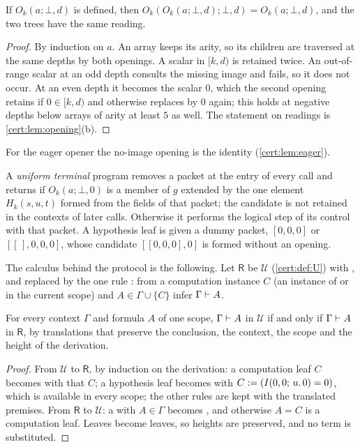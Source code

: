 \begin{lemma}\label{cert:lem:retraction}
If $O_k(a;\bot,d)$ is defined, then $O_k(O_k(a;\bot,d);\bot,d)=O_k(a;\bot,d)$,
and the two trees have the same reading.
\end{lemma}
\begin{proof}
By induction on $a$. An array keeps its arity, so its children are traversed
at the same depths by both openings. A scalar in $[k,d)$ is retained twice. An
out-of-range scalar at an odd depth consults the missing image and fails, so
it does not occur. At an even depth it becomes the scalar $0$, which the second
opening retains if $0\in[k,d)$ and otherwise replaces by $0$ again; this holds
at negative depths below arrays of arity at least $5$ as well. The statement
on readings is \cref{cert:lem:opening}(b).
\end{proof}

For the eager opener the no-image opening is the identity
(\cref{cert:lem:eager}).

\begin{definition}\label{cert:def:terminal}
A \emph{uniform terminal} program removes a packet at the entry of every call
and returns if $O_k(a;\bot,0)$ is a member of $g$ extended by the one element
$H_k(s,u,t)$ formed from the fields of that packet; the candidate is not
retained in the contexts of later calls. Otherwise it performs the logical
step of its control with that packet. A hypothesis leaf is given a dummy
packet, $[0,0,0]$ or $[[\,],0,0,0]$, whose candidate $[[0,0,0],0]$ is formed
without an opening.
\end{definition}

The calculus behind the protocol is the following. Let $\mathsf R$ be
$\mathcal U$ (\cref{cert:def:U}) with ,  and
 replaced by the one rule : from a computation
instance $C$ (an instance of  or  in the current
scope) and $A\in\Gamma\cup\{C\}$ infer $\Gamma\vdash A$.

\begin{theorem}\label{cert:thm:shared-leaf}
For every context $\Gamma$ and formula $A$ of one scope,
$\Gamma\vdash A$ in $\mathcal U$ if and only if $\Gamma\vdash A$ in
$\mathsf R$, by translations that preserve the conclusion, the context, the
scope and the height of the derivation.
\end{theorem}
\begin{proof}
From $\mathcal U$ to $\mathsf R$, by induction on the derivation: a
computation leaf $C$ becomes  with that $C$; a hypothesis leaf
becomes  with $C\mathrel{:=}(I(0,0;\,u.\,0)=0)$, which is available
in every scope; the other rules are kept with the translated premises. From
$\mathsf R$ to $\mathcal U$: a  with $A\in\Gamma$ becomes
, and otherwise $A=C$ is a computation leaf. Leaves become
leaves, so heights are preserved, and no term is substituted.
\end{proof}

